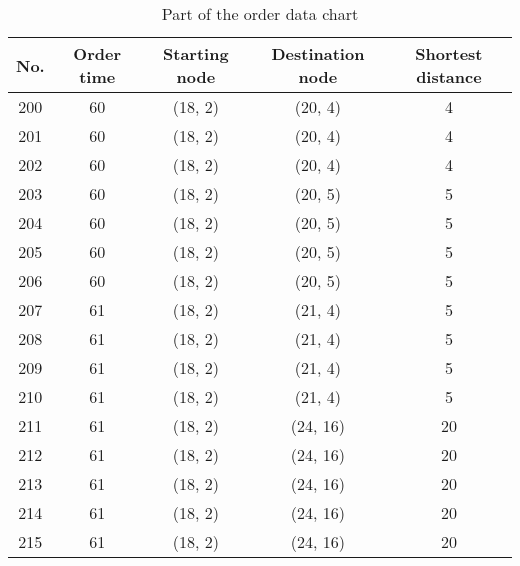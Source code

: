 \begin{Appendix}
    \begin{table}[H]
        \centering
        \caption{Part of the order data chart}
        \label{table.OrderChart}
        \begin{tabular}{ccccc}
            \toprule
            \textbf{No.}    &   \textbf{Order time} &   \textbf{Starting node}  &   \textbf{Destination node}   &   \textbf{Shortest distance}   \\
            \midrule
            200             &   60                  &    (18, 2)                 &   (20, 4)    &   4   \\
            201             &   60                  &    (18, 2)                 &   (20, 4)    &   4   \\
            202             &   60                  &    (18, 2)                 &   (20, 4)    &   4   \\
            203             &   60                  &    (18, 2)                 &   (20, 5)    &   5   \\
            204             &   60                  &    (18, 2)                 &   (20, 5)    &   5   \\
            205             &   60                  &    (18, 2)                 &   (20, 5)    &   5   \\
            206             &   60                  &    (18, 2)                 &   (20, 5)    &   5   \\
            207             &   61                  &    (18, 2)                 &   (21, 4)    &   5   \\
            208             &   61                  &    (18, 2)                 &   (21, 4)    &   5   \\
            209             &   61                  &    (18, 2)                 &   (21, 4)    &   5   \\
            210             &   61                  &    (18, 2)                 &   (21, 4)    &   5   \\
            211             &   61                  &    (18, 2)                 &   (24, 16)   &   20  \\
            212             &   61                  &    (18, 2)                 &   (24, 16)   &   20  \\
            213             &   61                  &    (18, 2)                 &   (24, 16)   &   20  \\
            214             &   61                  &    (18, 2)                 &   (24, 16)   &   20  \\
            215             &   61                  &    (18, 2)                 &   (24, 16)   &   20  \\
            \bottomrule
        \end{tabular}
    \end{table}

\end{Appendix}